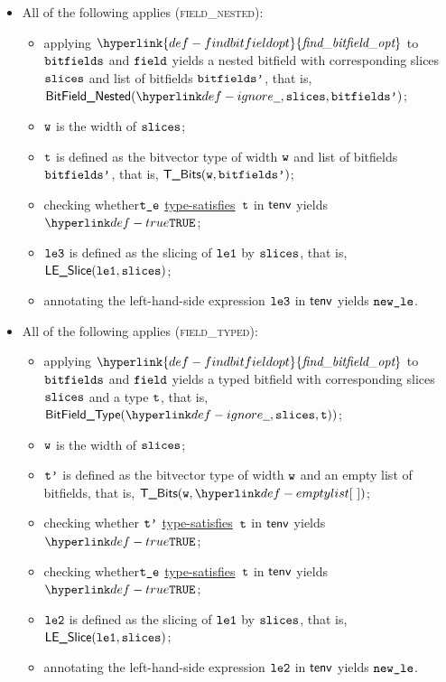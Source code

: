 \documentclass{book}
\newcommand\ProseOrTypeError[0]{\ProseTerminateAs{\TypeErrorConfig}}
\newcommand\findbitfieldopt[0]{\hyperlink{def-findbitfieldopt}{\textfunc{find\_bitfield\_opt}}}
\newcommand\typesatisfies[0]{\hyperlink{def-typesatisfies}{type-satisfies}}
\begin{document}
\begin{itemize}
\begin{itemize}
    \item All of the following applies (\textsc{field\_nested}):
    \begin{itemize}
      \item applying $\findbitfieldopt$ to $\texttt{bitfields}$ and $\texttt{field}$ yields a nested bitfield with corresponding
            slices $\texttt{slices}$ and list of bitfields $\texttt{bitfields'}$, that is, \\ $\BitFieldNested(\Ignore, \slices, \bitfieldsp)$;
      \item $\texttt{w}$ is the width of $\texttt{slices}$;
      \item $\texttt{t}$ is defined as the bitvector type of width $\texttt{w}$ and list of bitfields $\texttt{bitfields'}$, that is, $\textsf{T\_Bits}(\texttt{w}, \texttt{bitfields'})$;
      \item checking whether$\texttt{t\_e}$ \typesatisfies\ $\texttt{t}$ in $\textsf{tenv}$ yields $\True$\ProseOrTypeError;
      \item $\texttt{le3}$ is defined as the slicing of $\texttt{le1}$ by $\texttt{slices}$, that is, \\ $\textsf{LE\_Slice}(\texttt{le1}, \texttt{slices})$;
      \item annotating the left-hand-side expression $\texttt{le3}$ in $\textsf{tenv}$ yields $\texttt{new\_le}$\ProseOrTypeError.
    \end{itemize}

    \item All of the following applies (\textsc{field\_typed}):
    \begin{itemize}
      \item applying $\findbitfieldopt$ to $\texttt{bitfields}$ and $\texttt{field}$ yields a typed bitfield with corresponding
            slices $\texttt{slices}$ and a type $\texttt{t}$, that is, \\ $\BitFieldType(\Ignore, \vslices, \vt))$;
      \item $\texttt{w}$ is the width of $\texttt{slices}$;
      \item $\texttt{t'}$ is defined as the bitvector type of width $\texttt{w}$ and an empty list of bitfields, that is, $\TBits(\vw , \emptylist)$;
      \item checking whether $\texttt{t'}$ \typesatisfies\ $\texttt{t}$ in $\textsf{tenv}$ yields $\True$\ProseOrTypeError;
      \item checking whether$\texttt{t\_e}$ \typesatisfies\ $\texttt{t}$ in $\textsf{tenv}$ yields $\True$\ProseOrTypeError;
      \item $\texttt{le2}$ is defined as the slicing of $\texttt{le1}$ by $\texttt{slices}$, that is, \\ $\textsf{LE\_Slice}(\texttt{le1}, \texttt{slices})$;
      \item annotating the left-hand-side expression $\texttt{le2}$ in $\textsf{tenv}$ yields $\texttt{new\_le}$\ProseOrTypeError.
    \end{itemize}
  \end{itemize}
\end{itemize}
\end{document}
